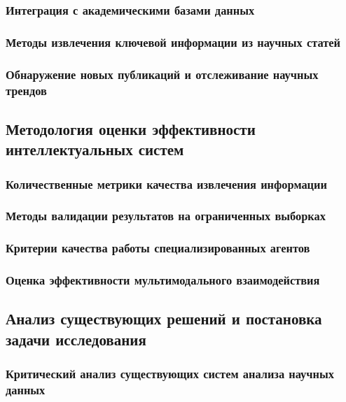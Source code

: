 \documentclass{syksu-coursework}
\begin{document}
\subsubsection{Интеграция с академическими базами данных}

\subsubsection{Методы извлечения ключевой информации из научных статей}

\subsubsection{Обнаружение новых публикаций и отслеживание научных трендов}

\subsection{Методология оценки эффективности интеллектуальных систем}

\subsubsection{Количественные метрики качества извлечения информации}

\subsubsection{Методы валидации результатов на ограниченных выборках}

\subsubsection{Критерии качества работы специализированных агентов}

\subsubsection{Оценка эффективности мультимодального взаимодействия}

\subsection{Анализ существующих решений и постановка задачи исследования}

\subsubsection{Критический анализ существующих систем анализа научных данных}
\end{document}
